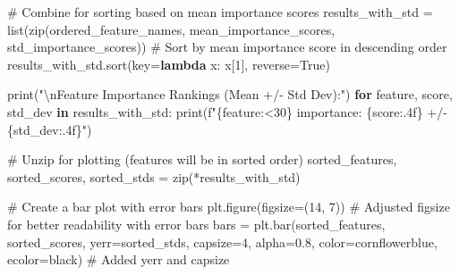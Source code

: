 \documentclass[
  letterpaper,
  DIV=11,
  numbers=noendperiod]{scrreprt}
\newenvironment{Shaded}{\begin{snugshade}}{\end{snugshade}}
\newcommand{\BuiltInTok}[1]{\textcolor[rgb]{0.00,0.23,0.31}{#1}}
\newcommand{\CharTok}[1]{\textcolor[rgb]{0.13,0.47,0.30}{#1}}
\newcommand{\CommentTok}[1]{\textcolor[rgb]{0.37,0.37,0.37}{#1}}
\newcommand{\ControlFlowTok}[1]{\textcolor[rgb]{0.00,0.23,0.31}{\textbf{#1}}}
\newcommand{\DecValTok}[1]{\textcolor[rgb]{0.68,0.00,0.00}{#1}}
\newcommand{\FloatTok}[1]{\textcolor[rgb]{0.68,0.00,0.00}{#1}}
\newcommand{\KeywordTok}[1]{\textcolor[rgb]{0.00,0.23,0.31}{\textbf{#1}}}
\newcommand{\NormalTok}[1]{\textcolor[rgb]{0.00,0.23,0.31}{#1}}
\newcommand{\OperatorTok}[1]{\textcolor[rgb]{0.37,0.37,0.37}{#1}}
\newcommand{\SpecialCharTok}[1]{\textcolor[rgb]{0.37,0.37,0.37}{#1}}
\newcommand{\SpecialStringTok}[1]{\textcolor[rgb]{0.13,0.47,0.30}{#1}}
\newcommand{\StringTok}[1]{\textcolor[rgb]{0.13,0.47,0.30}{#1}}
\newcommand{\VariableTok}[1]{\textcolor[rgb]{0.07,0.07,0.07}{#1}}
\begin{document}
\begin{Shaded}
\begin{Highlighting}[]
\CommentTok{\# Combine for sorting based on mean importance scores}
\NormalTok{results\_with\_std }\OperatorTok{=} \BuiltInTok{list}\NormalTok{(}\BuiltInTok{zip}\NormalTok{(ordered\_feature\_names, mean\_importance\_scores, std\_importance\_scores))}
\CommentTok{\# Sort by mean importance score in descending order}
\NormalTok{results\_with\_std.sort(key}\OperatorTok{=}\KeywordTok{lambda}\NormalTok{ x: x[}\DecValTok{1}\NormalTok{], reverse}\OperatorTok{=}\VariableTok{True}\NormalTok{)}

\BuiltInTok{print}\NormalTok{(}\StringTok{"}\CharTok{\textbackslash{}n}\StringTok{Feature Importance Rankings (Mean +/{-} Std Dev):"}\NormalTok{)}
\ControlFlowTok{for}\NormalTok{ feature, score, std\_dev }\KeywordTok{in}\NormalTok{ results\_with\_std:}
    \BuiltInTok{print}\NormalTok{(}\SpecialStringTok{f"}\SpecialCharTok{\{}\NormalTok{feature}\SpecialCharTok{:\textless{}30\}}\SpecialStringTok{ importance: }\SpecialCharTok{\{}\NormalTok{score}\SpecialCharTok{:.4f\}}\SpecialStringTok{ +/{-} }\SpecialCharTok{\{}\NormalTok{std\_dev}\SpecialCharTok{:.4f\}}\SpecialStringTok{"}\NormalTok{)}

\CommentTok{\# Unzip for plotting (features will be in sorted order)}
\NormalTok{sorted\_features, sorted\_scores, sorted\_stds }\OperatorTok{=} \BuiltInTok{zip}\NormalTok{(}\OperatorTok{*}\NormalTok{results\_with\_std)}

\CommentTok{\# Create a bar plot with error bars}
\NormalTok{plt.figure(figsize}\OperatorTok{=}\NormalTok{(}\DecValTok{14}\NormalTok{, }\DecValTok{7}\NormalTok{)) }\CommentTok{\# Adjusted figsize for better readability with error bars}
\NormalTok{bars }\OperatorTok{=}\NormalTok{ plt.bar(sorted\_features, sorted\_scores, yerr}\OperatorTok{=}\NormalTok{sorted\_stds,}
\NormalTok{               capsize}\OperatorTok{=}\DecValTok{4}\NormalTok{, alpha}\OperatorTok{=}\FloatTok{0.8}\NormalTok{, color}\OperatorTok{=}\StringTok{\textquotesingle{}cornflowerblue\textquotesingle{}}\NormalTok{, ecolor}\OperatorTok{=}\StringTok{\textquotesingle{}black\textquotesingle{}}\NormalTok{) }\CommentTok{\# Added yerr and capsize}


\end{Highlighting}
\end{Shaded}
\end{document}
